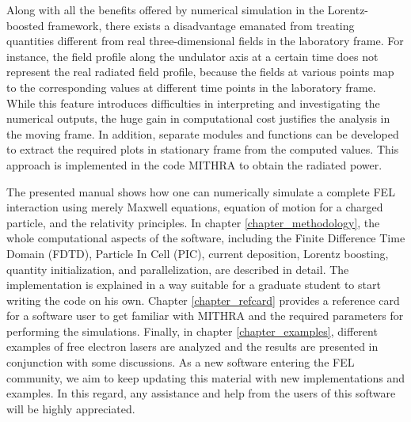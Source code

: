 Along with all the benefits offered by numerical simulation in the Lorentz-boosted framework, there exists a disadvantage emanated from treating quantities different from real three-dimensional fields in the laboratory frame.
%
For instance, the field profile along the undulator axis at a certain time does not represent the real radiated field profile, because the fields at various points map to the corresponding values at different time points in the laboratory frame.
%
While this feature introduces difficulties in interpreting and investigating the numerical outputs, the huge gain in computational cost justifies the analysis in the moving frame.
%
In addition, separate modules and functions can be developed to extract the required plots in stationary frame from the computed values.
%
This approach is implemented in the code MITHRA to obtain the radiated power.

The presented manual shows how one can numerically simulate a complete FEL interaction using merely Maxwell equations, equation of motion for a charged particle, and the relativity principles.
%
In chapter \ref{chapter_methodology}, the whole computational aspects of the software, including the Finite Difference Time Domain (FDTD), Particle In Cell (PIC), current deposition, Lorentz boosting, quantity initialization, and parallelization, are described in detail.
%
The implementation is explained in a way suitable for a graduate student to start writing the code on his own.
%
Chapter \ref{chapter_refcard} provides a reference card for a software user to get familiar with MITHRA and the required parameters for performing the simulations.
%
Finally, in chapter \ref{chapter_examples}, different examples of free electron lasers are analyzed and the results are presented in conjunction with some discussions.
%
As a new software entering the FEL community, we aim to keep updating this material with new implementations and examples.
%
In this regard, any assistance and help from the users of this software will be highly appreciated.
